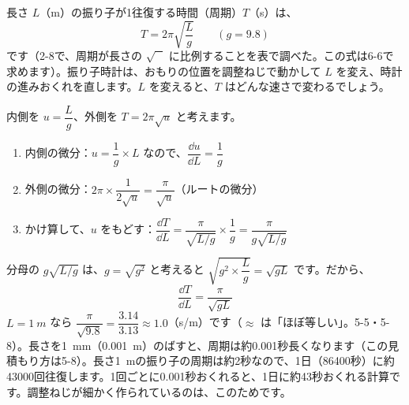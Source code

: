 \leavevmode\label{bk:5-6:furiko}\noindent\begin{minipage}[c]{0.7\linewidth}
長さ $L$（m）の振り子が1往復する時間（周期）$T$（s）は、
\[ T=2\pi\sqrt{\frac{L}{g}}\qquad(g=9.8) \]
です（2-8で、周期が長さの $\sqrt{\phantom{L}}$ に比例することを表で調べた。この式は6-6で求めます）。振り子時計は、おもりの位置を調整ねじで動かして $L$ を変え、時計の進みおくれを直します。$L$ を変えると、$T$ はどんな速さで変わるでしょう。
\end{minipage}\hfill
\begin{minipage}[c]{0.26\linewidth}\centering
{}
\end{minipage}

\vspace{2pt}
内側を $u=\dfrac{L}{g}$、外側を $T=2\pi\sqrt{u}$ と考えます。
\begin{enumerate}[label={\bkcircled{\arabic*}}, leftmargin=2.4\zw, itemsep=1pt, topsep=2pt]
\item 内側の微分：$u=\dfrac{1}{g}\times L$ なので、$\dfrac{\dd u}{\dd L}=\dfrac{1}{g}$
\item 外側の微分：$2\pi\times\dfrac{1}{2\sqrt{u}}=\dfrac{\pi}{\sqrt{u}}$（ルートの微分）
\item かけ算して、$u$ をもどす：$\dfrac{\dd T}{\dd L}=\dfrac{\pi}{\sqrt{L/g}}\times\dfrac{1}{g}=\dfrac{\pi}{g\sqrt{L/g}}$
\end{enumerate}
分母の $g\sqrt{L/g}$ は、$g=\sqrt{g^2}$ と考えると $\sqrt{g^2\times\dfrac{L}{g}}=\sqrt{gL}$ です。だから、
\[ \frac{\dd T}{\dd L}=\frac{\pi}{\sqrt{gL}} \]
$L=\qty{1}{m}$ なら $\dfrac{\pi}{\sqrt{9.8}}=\dfrac{3.14}{3.13}\approx1.0$（s/m）です（$\approx$ は「ほぼ等しい」。5-5・5-8）。長さを\qty{1}{mm}（\qty{0.001}{m}）のばすと、周期は約0.001秒長くなります（この見積もり方は5-8）。長さ\qty{1}{m}の振り子の周期は約2秒なので、1日（86400秒）に約43000回往復します。1回ごとに0.001秒おくれると、1日に約43秒おくれる計算です。調整ねじが細かく作られているのは、このためです。


